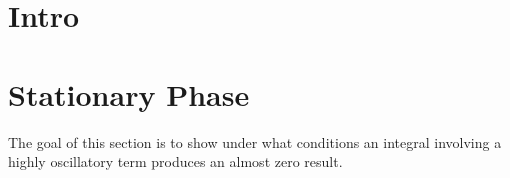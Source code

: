 \documentclass{article}
\theoremstyle{plain}
\begin{document}


\section{Intro}\label{sec_intro}



\section{Stationary Phase}\label{sec_stationaryPhase}


The goal of this section is to show under what conditions an integral involving a
highly oscillatory term produces an almost zero result.
\end{document}
